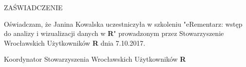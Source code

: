 \documentclass[12pt,firstpage,polish,a4paper]{letter}
\date{Wrocław, \today}
\newcommand{\memberName}{Janina Kowalska }
\begin{document}
 
\begin{letter}{}{}
 
\begin{center}\opening{ZAŚWIADCZENIE}
\end{center}

Oświadczam, że \memberName uczestniczyła w szkoleniu "eRementarz: wstęp do analizy i wizualizacji danych w \textbf{R}" prowadzonym przez Stowarzyszenie Wrocławskich Użytkowników \textbf{R} dnia 7.10.2017.


\vspace{1in}

\begin{flushright}Koordynator Stowarzyszenia Wrocławskich Użytkowników \textbf{R}
\end{flushright}
\end{letter}
\end{document}
